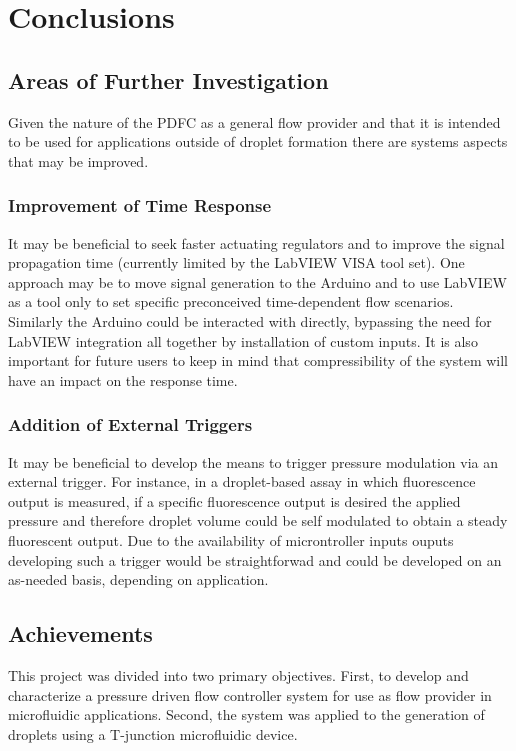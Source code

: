 \chapter{Conclusions}


\section{Areas of Further Investigation}

Given the nature of the PDFC as a general flow provider and that it is intended to be used for applications outside of droplet formation there are systems aspects that may be improved.

\subsection{Improvement of Time Response}
It may be beneficial to seek faster actuating regulators and to improve the signal propagation time (currently limited by the LabVIEW VISA tool set). One approach may be to move signal generation to the Arduino and to use LabVIEW as a tool only to set specific preconceived time-dependent flow scenarios. Similarly the Arduino could be interacted with directly, bypassing the need for LabVIEW integration all together by installation of custom inputs. It is also important for future users to keep in mind that compressibility of the system will have an impact on the response time.

\subsection{Addition of External Triggers}
It may be beneficial to develop the means to trigger pressure modulation via an external trigger. For instance, in a droplet-based assay in which fluorescence output is measured, if a specific fluorescence output is desired the applied pressure and therefore droplet volume could be self modulated to obtain a steady fluorescent output. Due to the availability of microntroller inputs ouputs developing such a trigger would be straightforwad and could be developed on an as-needed basis, depending on application.

\section{Achievements}
This project was divided into two primary objectives. First, to develop and characterize a pressure driven flow controller system for use as flow provider in microfluidic applications. Second, the system was applied to the generation of droplets using a T-junction microfluidic device.

